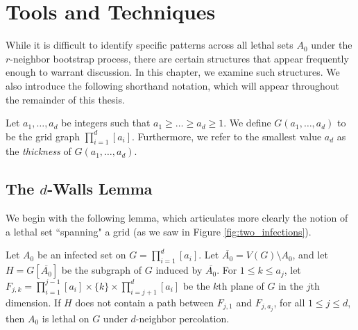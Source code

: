 \chapter{Tools and Techniques}

While it is difficult to identify specific patterns across all lethal sets $A_0$ under the $r$-neighbor bootstrap process, there are certain structures that appear frequently enough to warrant discussion. In this chapter, we examine such structures. We also introduce the following shorthand notation, which will appear throughout the remainder of this thesis. 

\begin{defn}
\label{defn:thickness}
Let $a_1, \dots, a_d$ be integers such that $a_1 \geq \dots \geq a_d \geq 1$. We define $G(a_1, \dots, a_d)$ to be the grid graph $\prod_{i=1}^d [a_i]$. Furthermore, we refer to the smallest value $a_d$ as the \emph{thickness} of $G(a_1, \dots, a_d)$.
\end{defn}

\section{The $d$-Walls Lemma}

We begin with the following lemma, which articulates more clearly the notion of a lethal set ``spanning" a grid (as we saw in Figure \ref{fig:two_infections}).

\begin{lem}
\label{lem:walls}
Let $A_0$ be an infected set on $G = \prod_{i=1}^d [a_i]$. Let $\overline{A_0} = V(G) \setminus A_0$, and let $H = G[\overline{A_0}]$ be the subgraph of $G$ induced by $\overline{A_0}$. For $1 \leq k \leq a_j$, let $F_{j,k} = \prod_{i=1}^{j-1} [a_i] \times \{k\} \times \prod_{i=j+1}^{d} [a_i]$ be the $k$th plane of $G$ in the $j$th dimension. If $H$ does not contain a path between $F_{j,1}$ and $F_{j,a_j}$, for all $1 \leq j \leq d$, then $A_0$ is lethal on $G$ under $d$-neighbor percolation.
\end{lem}

